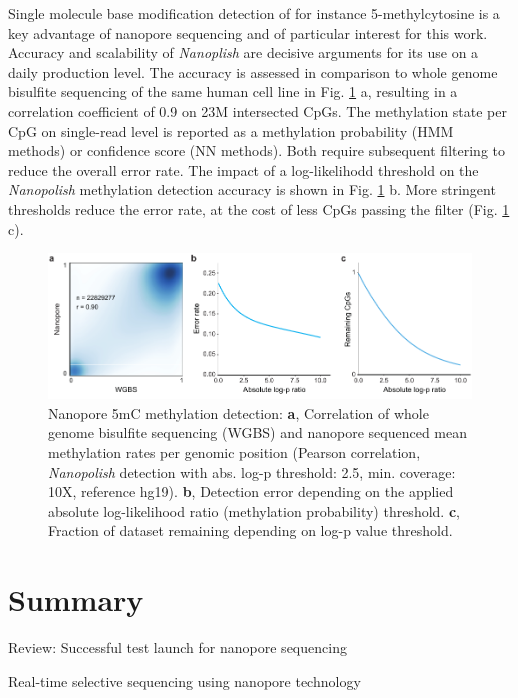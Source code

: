Single molecule base modification detection of for instance 5-methylcytosine is a key advantage of nanopore sequencing and of particular interest for this work.
Accuracy and scalability of \textit{Nanoplish} are decisive arguments for its use on a daily production level.
The accuracy is assessed in comparison to whole genome bisulfite sequencing of the same human cell line in Fig. \ref{fig:state_of_art:methylation} a, resulting in a correlation coefficient of 0.9 on 23M intersected CpGs.
The methylation state per CpG on single-read level is reported as a methylation probability (HMM methods) or confidence score (NN methods).
Both require subsequent filtering to reduce the overall error rate.
The impact of a log-likelihodd threshold on the \textit{Nanopolish} methylation detection accuracy is shown in Fig. \ref{fig:state_of_art:methylation} b.
More stringent thresholds reduce the error rate, at the cost of less CpGs passing the filter (Fig. \ref{fig:state_of_art:methylation} c).

\begin{figure}[h]
    \centering
    \includegraphics[width=1.0\textwidth]{figures/state_of_art/methylation.pdf}
    \captionsetup{format=plain}
    \caption[Nanopore methylation detection]{Nanopore 5mC methylation detection: \textbf{a}, Correlation of whole genome bisulfite sequencing (WGBS) and nanopore sequenced mean methylation rates per genomic position (Pearson correlation, \textit{Nanopolish} detection with abs. log-p threshold: 2.5, min. coverage: 10X, reference hg19). \textbf{b}, Detection error depending on the applied absolute log-likelihood ratio (methylation probability) threshold. \textbf{c}, Fraction of dataset remaining depending on log-p value threshold.}
    \label{fig:state_of_art:methylation}
\end{figure}




\section{Summary}
\label{sec:stat_of_art:summary}


Review: Successful test launch for nanopore sequencing \cite{Loman2015a}

Real-time selective sequencing using nanopore technology \cite{Loose2016}	







